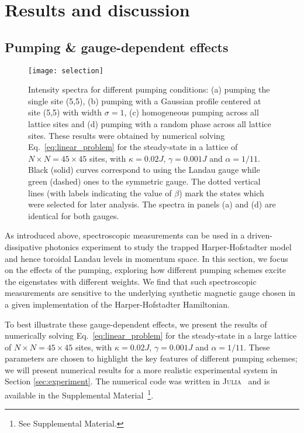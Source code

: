 \section{Results and discussion}
\label{sec:results}

\subsection{Pumping \& gauge-dependent effects}
\label{sec:selection}

\begin{figure}[tb]\centering
  \texttt{[image: selection]} %
  \caption{Intensity spectra for different pumping conditions: (a)
    pumping the single site (5,5), (b) pumping with a Gaussian
    profile centered at site (5,5) with width $\sigma=1$, (c) homogeneous pumping across all lattice sites and (d) pumping with a random
    phase across all lattice sites. These results were obtained by numerical solving Eq.~\eqref{eq:linear_problem} for the steady-state in a lattice of
$N \times N = 45 \times 45$ sites, with $\kappa = 0.02 J$,
$\gamma = 0.001 J$ and $\alpha = 1/11$.   
    Black (solid) curves correspond to using the Landau gauge while
    green (dashed) ones to the symmetric gauge. The dotted vertical
    lines (with labels indicating the value of $\beta$) mark the
    states which were selected for later analysis. The spectra in
    panels (a) and (d) are identical for both gauges.}
  \label{fig:pumping_schemes}
\end{figure}

As introduced above, spectroscopic measurements can be used in a driven-dissipative photonics experiment to study the trapped Harper-Hofstadter model and hence toroidal Landau levels in momentum space. In this section, we focus on the effects of the pumping, exploring how different pumping schemes excite the eigenstates with different weights. We find that such spectroscopic measurements are sensitive to the underlying synthetic magnetic gauge chosen in a given implementation of the Harper-Hofstadter Hamiltonian. 

To best illustrate these gauge-dependent effects, we present the results of numerically solving
Eq.~\eqref{eq:linear_problem} for the steady-state in a large lattice of
$N \times N = 45 \times 45$ sites, with $\kappa = 0.02 J$,
$\gamma = 0.001 J$ and $\alpha = 1/11$.  These parameters are chosen to highlight the key features of different pumping schemes; we will present numerical results for a more realistic experimental system in Section \ref{sec:experiment}.  The numerical code was written
in \textsc{Julia}~\cite{bezanson2014julia} and is available in the Supplemental Material~\footnote{See Supplemental Material.}. 

